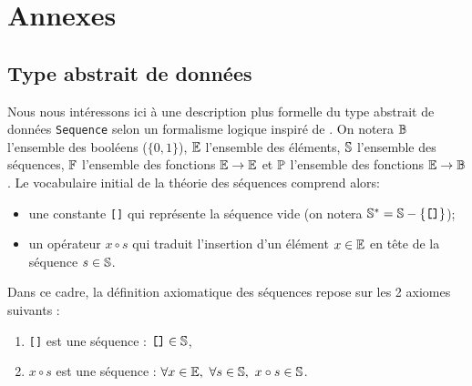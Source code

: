 \newpage
\setlength{\textwidth}{16cm}
\setlength{\linewidth}{16cm}
\setlength{\textheight}{16cm}
\setlength{\marginparwidth}{8cm}
\setlength{\marginparsep}{1cm}
\setlength{\oddsidemargin}{0cm}
\setlength{\evensidemargin}{+8cm}
\setlength{\topmargin}{-0.75cm}

\section{Annexes}

\subsection{Type abstrait de données}\label{tad:sequence}
Nous nous intéressons ici à une description plus formelle du type abstrait de données {\tt Sequence} selon un formalisme
logique inspiré de \cite{manna}. 
On notera $\Bbb B$ l'ensemble des booléens ($\{0,1\}$),
$\Bbb E$ l'ensemble des éléments, $\Bbb S$ l'ensemble des séquences, $\Bbb F$ l'ensemble
des fonctions $\Bbb E \rightarrow \Bbb E$ et $\Bbb P$ l'ensemble des fonctions
$\Bbb E \rightarrow \Bbb B$.
Le vocabulaire initial de la th\'eorie des séquences comprend alors:
\begin{itemize}
\item une constante {\tt []} qui représente la séquence vide (on notera $\Bbb S^* = \Bbb S - \{\mbox{\tt []}\}$);
\item un opérateur $x \circ s$ qui traduit l'insertion d'un élément $x\in \Bbb E$ en tête
	de la séquence $s \in \Bbb S$.
\end{itemize}
Dans ce cadre, la définition axiomatique des séquences repose sur les 2 axiomes suivants :
\begin{enumerate}
\item {\tt []} est une séquence : $\mbox{\tt []} \in \Bbb S $,
\item $x \circ s$ est une séquence : $\forall x \in {\Bbb E},\ \forall s \in {\Bbb S},\ x \circ s \in {\Bbb S}$.
\end{enumerate}

